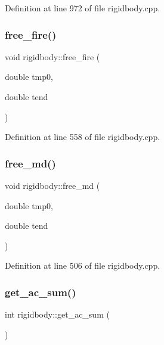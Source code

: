 Definition at line 972 of file rigidbody.\+cpp.

\mbox{\label{classrigidbody_adcb984a4d69585e1c617d9506218ac9c}} 
\subsubsection{\texorpdfstring{free\+\_\+fire()}{free\_fire()}}
{\footnotesize\ttfamily void rigidbody\+::free\+\_\+fire (\begin{DoxyParamCaption}\item[{double}]{tmp0,  }\item[{double}]{tend }\end{DoxyParamCaption})}



Definition at line 558 of file rigidbody.\+cpp.

\mbox{\label{classrigidbody_a0855a20a0df2aa086f24f2a383cf8189}} 
\subsubsection{\texorpdfstring{free\+\_\+md()}{free\_md()}}
{\footnotesize\ttfamily void rigidbody\+::free\+\_\+md (\begin{DoxyParamCaption}\item[{double}]{tmp0,  }\item[{double}]{tend }\end{DoxyParamCaption})}



Definition at line 506 of file rigidbody.\+cpp.

\mbox{\label{classrigidbody_a9287ef3ed29115edff7a823300b7623d}} 
\subsubsection{\texorpdfstring{get\+\_\+ac\+\_\+sum()}{get\_ac\_sum()}}
{\footnotesize\ttfamily int rigidbody\+::get\+\_\+ac\+\_\+sum (\begin{DoxyParamCaption}{ }\end{DoxyParamCaption})}



